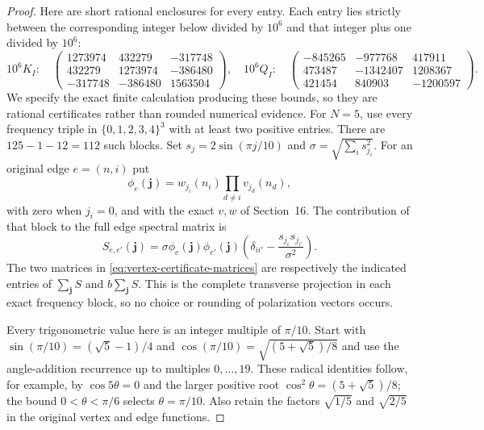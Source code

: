 \begin{proof}
Here are short rational enclosures for every entry. Each entry lies
strictly between the corresponding integer below divided by $10^6$
and that integer plus one divided by $10^6$:
\begin{equation}\label{eq:vertex-certificate-matrices}
 10^6K_I:\quad
 \begin{pmatrix}
 1273974&432279&-317748\\
 432279&1273974&-386480\\
 -317748&-386480&1563504
 \end{pmatrix},\quad
 10^6Q_I:\quad
 \begin{pmatrix}
 -845265&-977768&417911\\
 473487&-1342407&1208367\\
 421454&840903&-1200597
 \end{pmatrix}.
\end{equation}
We specify the exact finite calculation producing these bounds, so
they are rational certificates rather than rounded numerical evidence.
For $N=5$, use every frequency triple in
$\{0,1,2,3,4\}^3$ with at least two positive entries. There are
$125-1-12=112$ such blocks. Set
$s_j=2\sin(\pi j/10)$ and $\sigma=\sqrt{\sum_i s_{j_i}^2}$.
For an original edge $e=(n,i)$ put
\[
 \phi_e(\boldsymbol j)=w_{j_i}(n_i)\prod_{d\ne i}v_{j_d}(n_d),
\]
with zero when $j_i=0$, and with the exact $v,w$ of Section~16.
The contribution of that block to the full edge spectral matrix is
\begin{equation}\label{eq:vertex-projector-sum}
 S_{e,e'}(\boldsymbol j)=\sigma\phi_e(\boldsymbol j)
 \phi_{e'}(\boldsymbol j)
       \left(\delta_{i i'}-\frac{s_{j_i}s_{j_{i'}}}{\sigma^2}\right).
\end{equation}
The two matrices in \eqref{eq:vertex-certificate-matrices} are
respectively the indicated entries of $\sum_{\boldsymbol j}S$
and $b\sum_{\boldsymbol j}S$. This is the complete transverse
projection in each exact frequency block, so no choice or rounding
of polarization vectors occurs.

Every trigonometric value here is an integer multiple of $\pi/10$.
Start with
$\sin(\pi/10)=(\sqrt5-1)/4$ and
$\cos(\pi/10)=\sqrt{(5+\sqrt5)/8}$ and use the angle-addition
recurrence up to multiples $0,\ldots,19$. These radical identities
follow, for example, by $\cos5\theta=0$ and the larger positive
root $\cos^2\theta=(5+\sqrt5)/8$; the bound $0<\theta<\pi/6$
selects $\theta=\pi/10$. Also retain the factors $\sqrt{1/5}$
and $\sqrt{2/5}$ in the original vertex and edge functions.


\end{proof}
